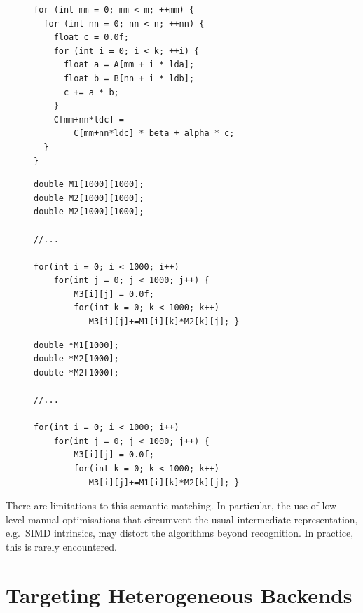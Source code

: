 \begin{figure}[p]
\begin{lstlisting}[language=MyCpp]
for (int mm = 0; mm < m; ++mm) {
  for (int nn = 0; nn < n; ++nn) {
    float c = 0.0f;
    for (int i = 0; i < k; ++i) {
      float a = A[mm + i * lda]; 
      float b = B[nn + i * ldb];
      c += a * b;
    }
    C[mm+nn*ldc] =
        C[mm+nn*ldc] * beta + alpha * c;
  }
}
\end{lstlisting}
\begin{lstlisting}[language=MyCpp,label={fig:gemmexamples},caption=
   {Two matching instances of ``{\tt GEMM}'':
    Although both loop nests are implemented very differently, they both match
    the same IDL specification and can be accelerated identically.}]
double M1[1000][1000];
double M2[1000][1000];
double M2[1000][1000];

//...

for(int i = 0; i < 1000; i++)
    for(int j = 0; j < 1000; j++) {
        M3[i][j] = 0.0f;
        for(int k = 0; k < 1000; k++)
           M3[i][j]+=M1[i][k]*M2[k][j]; }
\end{lstlisting}
\begin{lstlisting}[language=MyCpp,label={fig:gemmcounterexamples},caption=
   {This C program that does not match ``{\tt GEMM}''.
    Although the loop syntax is identical to the matching example from
    \Cref{fig:gemmexamples}, the different types of the matrices prevent
    detection.
    This is desirable:
    Established backends are incompatible with such non-contiguous memory
    layout.}]
double *M1[1000];
double *M2[1000];
double *M2[1000];

//...

for(int i = 0; i < 1000; i++)
    for(int j = 0; j < 1000; j++) {
        M3[i][j] = 0.0f;
        for(int k = 0; k < 1000; k++)
           M3[i][j]+=M1[i][k]*M2[k][j]; }
\end{lstlisting}
\end{figure}

    There are limitations to this semantic matching.
    In particular, the use of low-level manual optimisations that circumvent the
    usual intermediate representation, e.g.\ SIMD intrinsics, may distort the
    algorithms beyond recognition.
    In practice, this is rarely encountered.

\section{Targeting Heterogeneous Backends}

